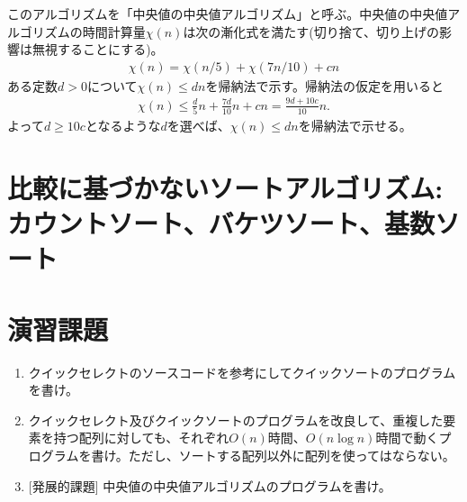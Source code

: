 \documentclass[a4paper,twoside,onecolumn,openany,article,10pt]{memoir}
\theoremstyle{remark}
\begin{document}
このアルゴリズムを「中央値の中央値アルゴリズム」と呼ぶ。中央値の中央値アルゴリズムの時間計算量$\chi(n)$は次の漸化式を満たす(切り捨て、切り上げの影響は無視することにする)。
\begin{align*}
\chi(n) = \chi(n/5) + \chi(7n/10) + cn
\end{align*}
ある定数$d>0$について$\chi(n)\le dn$を帰納法で示す。帰納法の仮定を用いると
\begin{align*}
\chi(n) \le \frac{d}{5}n + \frac{7d}{10}n + cn = \frac{9d + 10 c}{10} n.
\end{align*}
よって$d\ge 10 c$となるような$d$を選べば、$\chi(n)\le d n$を帰納法で示せる。

\section{比較に基づかないソートアルゴリズム: カウントソート、バケツソート、基数ソート}

\section{演習課題}
\begin{enumerate}
\item クイックセレクトのソースコードを参考にしてクイックソートのプログラムを書け。
\item クイックセレクト及びクイックソートのプログラムを改良して、重複した要素を持つ配列に対しても、それぞれ$O(n)$時間、$O(n\log n)$時間で動くプログラムを書け。ただし、ソートする配列以外に配列を使ってはならない。
\item {[発展的課題]} 中央値の中央値アルゴリズムのプログラムを書け。
\end{enumerate}
\end{document}
